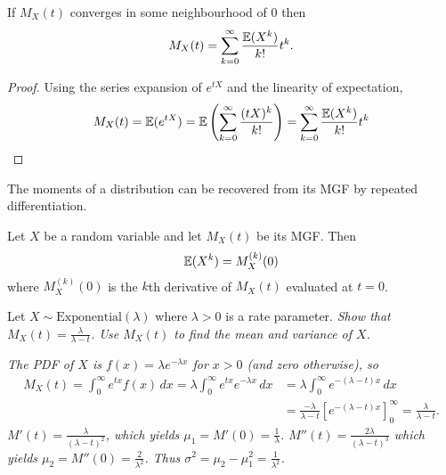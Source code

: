 
\begin{theorem}\label{thm:taylor_mgf}
If $M_X(t)$ converges in some neighbourhood of $0$ then
\[
M_X(t) = \sum_{k=0}^{\infty} \frac{\mathbb{E}(X^k)}{k!} t^k.
\]
\begin{proof}
Using the series expansion of $e^{tX}$ and the linearity of expectation,
\[
M_X(t) 
	= \mathbb{E}(e^{tX}) 
	= \mathbb{E}\left(\sum_{k=0}^{\infty} \frac{(tX)^k}{k!}\right)
	= \sum_{k=0}^{\infty} \frac{\mathbb{E}(X^k)}{k!} t^k
\]
\end{proof}
\end{theorem}

The moments of a distribution can be recovered from its MGF by repeated differentiation.

\begin{corollary}
Let $X$ be a random variable and let $M_X(t)$ be its MGF. Then 
\[
\mathbb{E}(X^k) = M_X^{(k)}(0)
\]
where $M_X^{(k)}(0)$ is the $k$th derivative of $M_X(t)$ evaluated at $t=0$. 
\end{corollary}

\begin{example}
Let $X\sim\text{Exponential}(\lambda)$ where $\lambda>0$ is a rate parameter. 
\ben
\it Show that $M_X(t)=\displaystyle\frac{\lambda}{\lambda-t}$.
\it Use $M_X(t)$ to find the mean and variance of $X$.
\een
\end{example}

\begin{solution}
\ben
\it %
The PDF of $X$ is $f(x)=\lambda e^{-\lambda x}$ for $x>0$ (and zero otherwise), so
\begin{align*}
M_X(t) 
	= \int_0^\infty e^{tx} f(x)\,dx 
	= \lambda \int_0^\infty e^{tx} e^{-\lambda x}\,dx 
	& = \lambda \int_0^\infty e^{-(\lambda-t)x}\,dx \\
	& = \frac{-\lambda}{\lambda-t} \left[e^{-(\lambda-t)x}\right]_0^\infty
	= \frac{\lambda}{\lambda-t}.
\end{align*}
\it %
\bit
\it $M'(t) = \displaystyle \frac{\lambda}{(\lambda-t)^2}$, which yields $\mu_1 = M'(0)  = \displaystyle\frac{1}{\lambda}$.
\it $M''(t) = \displaystyle \frac{2\lambda}{(\lambda-t)^3}$ which yields $\mu_2 = M''(0)  = \displaystyle\frac{2}{\lambda^2}$.
\it Thus $\sigma^2 = \mu_2 - \mu_1^2 = \displaystyle\frac{1}{\lambda^2}$.
\eit
\een
\end{solution}

